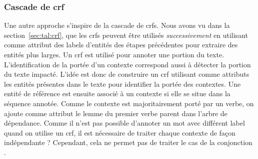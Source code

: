 \subsubsection{Cascade de \gls*{crf}}
\label{sec:tal:ctx:crf}

Une autre approche s'inspire de la cascade de \glspl{crf}.
Nous avons vu dans la section~\ref{sec:tal:crf}, que les \glspl{crf} peuvent être utilisés \emph{successivement} en utilisant comme attribut des labels d'entités des étapes précédentes pour extraire des entités plus larges.
Un \gls{crf} est utilisé pour annoter une portion du texte.
L'identification de la portée d'un contexte correspond aussi à détecter la portion du texte impacté.
L'idée est donc de construire un \gls{crf} utilisant comme attributs les entités présentes dans le texte pour identifier la portée des contextes.
Une entité de référence est ensuite associé à un contexte si elle se situe dans la séquence annotée.
Comme le contexte est majoritairement porté par un verbe, on ajoute comme attribut le lemme du premier verbe parent dans l'arbre de dépendance.
Comme il n'est pas possible d'annoter un mot avec différent label quand on utilise un \gls{crf}, il est nécessaire de traiter chaque contexte de façon indépendante ?
Cependant, cela ne permet pas de traiter le cas de la conjonction .
